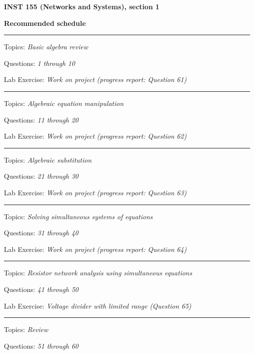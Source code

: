 
\centerline{\bf INST 155 (Networks and Systems), section 1} \bigskip 
 
\vskip 10pt

\noindent
{\bf Recommended schedule}

\vskip 5pt

\hrule \vskip 5pt
\noindent
{}

\hskip 10pt Topics: {\it Basic algebra review}
 
\hskip 10pt Questions: {\it 1 through 10}
 
\hskip 10pt Lab Exercise: {\it Work on project (progress report: Question 61)}
 
\vskip 10pt
\hrule \vskip 5pt
\noindent
{}

\hskip 10pt Topics: {\it Algebraic equation manipulation}
 
\hskip 10pt Questions: {\it 11 through 20}
 
\hskip 10pt Lab Exercise: {\it Work on project (progress report: Question 62)}
 
\vskip 10pt
\hrule \vskip 5pt
\noindent
{}

\hskip 10pt Topics: {\it Algebraic substitution}
 
\hskip 10pt Questions: {\it 21 through 30}
 
\hskip 10pt Lab Exercise: {\it Work on project (progress report: Question 63)}
 
\vskip 10pt
\hrule \vskip 5pt
\noindent
{}

\hskip 10pt Topics: {\it Solving simultaneous systems of equations}
 
\hskip 10pt Questions: {\it 31 through 40}
 
\hskip 10pt Lab Exercise: {\it Work on project (progress report: Question 64)}
 
\vskip 10pt
\hrule \vskip 5pt
\noindent
{}

\hskip 10pt Topics: {\it Resistor network analysis using simultaneous equations}
 
\hskip 10pt Questions: {\it 41 through 50}
 
\hskip 10pt Lab Exercise: {\it Voltage divider with limited range (Question 65)}
 
\vskip 10pt
\hrule \vskip 5pt
\noindent
{}

\hskip 10pt Topics: {\it Review}
 
\hskip 10pt Questions: {\it 51 through 60}
 
